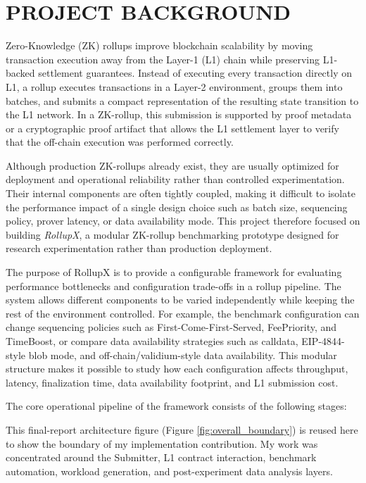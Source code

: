\chapter{PROJECT BACKGROUND}

Zero-Knowledge (ZK) rollups improve blockchain scalability by moving transaction execution away from the Layer-1 (L1) chain while preserving L1-backed settlement guarantees. Instead of executing every transaction directly on L1, a rollup executes transactions in a Layer-2 environment, groups them into batches, and submits a compact representation of the resulting state transition to the L1 network. In a ZK-rollup, this submission is supported by proof metadata or a cryptographic proof artifact that allows the L1 settlement layer to verify that the off-chain execution was performed correctly.

Although production ZK-rollups already exist, they are usually optimized for deployment and operational reliability rather than controlled experimentation. Their internal components are often tightly coupled, making it difficult to isolate the performance impact of a single design choice such as batch size, sequencing policy, prover latency, or data availability mode. This project therefore focused on building \textit{RollupX}, a modular ZK-rollup benchmarking prototype designed for research experimentation rather than production deployment.

The purpose of RollupX is to provide a configurable framework for evaluating performance bottlenecks and configuration trade-offs in a rollup pipeline. The system allows different components to be varied independently while keeping the rest of the environment controlled. For example, the benchmark configuration can change sequencing policies such as First-Come-First-Served, FeePriority, and TimeBoost, or compare data availability strategies such as calldata, EIP-4844-style blob mode, and off-chain/validium-style data availability. This modular structure makes it possible to study how each configuration affects throughput, latency, finalization time, data availability footprint, and L1 submission cost.

The core operational pipeline of the framework consists of the following stages:

This final-report architecture figure (Figure \ref{fig:overall_boundary}) is reused here to show the boundary of my implementation contribution. My work was concentrated around the Submitter, L1 contract interaction, benchmark automation, workload generation, and post-experiment data analysis layers.

